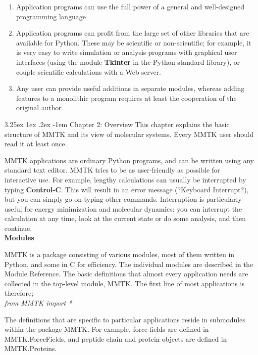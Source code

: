 \documentclass{article}
\makeatletter
\renewcommand\subparagraph{\@startsection{subparagraph}{6}{\parindent}%
  {3.25ex \@plus1ex \@minus .2ex}%
  {-1em}%
  {\normalfont\normalsize\bfseries}}
\makeatother
\begin{document}
\begin{enumerate}
   \item Application programs can use the full power of a general and
well-designed programming language
   \item Application programs can profit from the large set of other libraries that are available for Python.  These may be scientific or non-scientific; for example, it is very easy to write simulation or analysis programs with graphical user interfaces (using the module \textbf{Tkinter} in the Python standard library), or couple scientific calculations with a Web server.
   \item Any user can provide useful additions in separate modules, whereas adding features to a monolithic program requires at least the cooperation of the original author.
\end{enumerate}

\subparagraph{Chapter 2: Overview}
This chapter explains the basic structure of MMTK and its view of
molecular systems.  Every MMTK user should read it at least once.

MMTK applications are ordinary Python programs, and can be written
using any standard text editor. MMTK tries to be as user-friendly as possible for interactive use.  For example, lengthy calculations can usually be interrupted by typing \textbf{Control-C}. This will result in an error message (?Keyboard Interrupt?), but you can simply go on typing other commands.  Interruption is particularly useful for energy minimization and molecular dynamics:  you can interrupt the calculation at any time, look at the current state or do some analysis, and then continue. \\

\textbf{Modules}

MMTK is a package consisting of various modules, most of them written in Python, and some in C for efficiency.  The individual modules are described in the Module Reference.  The basic definitions that almost every application needs are collected in the top-level module, MMTK. The first line of most applications is therefore; \\

\textit{from MMTK import *}

The definitions that are specific to particular applications reside in submodules within the package MMTK. For example, force fields are defined in MMTK.ForceFields, and peptide chain and protein objects are defined in MMTK.Proteins.
\end{document}

